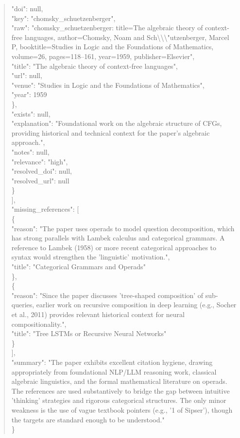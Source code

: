 \documentclass[11pt]{article}
\begin{document}
\begin{quote}
        "doi": null,\\
        "key": "chomsky\_schuetzenberger",\\
        "raw": "chomsky\_schuetzenberger: title=The algebraic theory of context-free languages, author=Chomsky, Noam and Sch\textbackslash{}\textbackslash{}\textbackslash{}"utzenberger, Marcel P, booktitle=Studies in Logic and the Foundations of Mathematics, volume=26, pages=118--161, year=1959, publisher=Elsevier",\\
        "title": "The algebraic theory of context-free languages",\\
        "url": null,\\
        "venue": "Studies in Logic and the Foundations of Mathematics",\\
        "year": 1959\\
      \},\\
      "exists": null,\\
      "explanation": "Foundational work on the algebraic structure of CFGs, providing historical and technical context for the paper's algebraic approach.",\\
      "notes": null,\\
      "relevance": "high",\\
      "resolved\_doi": null,\\
      "resolved\_url": null\\
    \}\\
  ],\\
  "missing\_references": [\\
    \{\\
      "reason": "The paper uses operads to model question decomposition, which has strong parallels with Lambek calculus and categorical grammars. A reference to Lambek (1958) or more recent categorical approaches to syntax would strengthen the 'linguistic' motivation.",\\
      "title": "Categorical Grammars and Operads"\\
    \},\\
    \{\\
      "reason": "Since the paper discusses 'tree-shaped composition' of sub-queries, earlier work on recursive composition in deep learning (e.g., Socher et al., 2011) provides relevant historical context for neural compositionality.",\\
      "title": "Tree LSTMs or Recursive Neural Networks"\\
    \}\\
  ],\\
  "summary": "The paper exhibits excellent citation hygiene, drawing appropriately from foundational NLP/LLM reasoning work, classical algebraic linguistics, and the formal mathematical literature on operads. The references are used substantively to bridge the gap between intuitive 'thinking' strategies and rigorous categorical structures. The only minor weakness is the use of vague textbook pointers (e.g., '1 of Sipser'), though the targets are standard enough to be understood."\\
\}\\
\end{quote}
\end{document}
